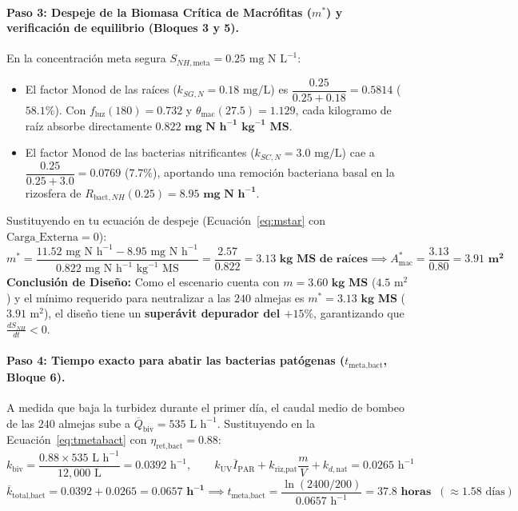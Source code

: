 \documentclass[11pt,letterpaper]{article}
\begin{document}
\paragraph{Paso 3: Despeje de la Biomasa Crítica de Macrófitas ($m^*$) y verificación de equilibrio (Bloques 3 y 5).}
En la concentración meta segura $S_{NH,\text{meta}} = 0.25\text{ mg N L}^{-1}$:
\begin{itemize}
    \item El factor Monod de las raíces ($k_{SG,N}=0.18\text{ mg/L}$) es $\dfrac{0.25}{0.25 + 0.18} = \mathbf{0.5814}$ ($58.1\%$). Con $f_{\text{luz}}(180) = 0.732$ y $\theta_{\text{mac}}(27.5) = 1.129$, cada kilogramo de raíz absorbe directamente $\mathbf{0.822\text{ mg N h}^{-1}\text{ kg}^{-1}\text{ MS}}$.
    \item El factor Monod de las bacterias nitrificantes ($k_{SC,N}=3.0\text{ mg/L}$) cae a $\dfrac{0.25}{0.25 + 3.0} = \mathbf{0.0769}$ ($7.7\%$), aportando una remoción bacteriana basal en la rizosfera de $R_{\text{bact},NH}(0.25) = \mathbf{8.95\text{ mg N h}^{-1}}$.
\end{itemize}
Sustituyendo en tu ecuación de despeje (Ecuación~\ref{eq:mstar} con $\text{Carga\_Externa} = 0$):
\[
    m^* = \frac{11.52\text{ mg N h}^{-1} - 8.95\text{ mg N h}^{-1}}{0.822\text{ mg N h}^{-1}\text{ kg}^{-1}\text{ MS}} = \frac{2.57}{0.822} = \mathbf{3.13\text{ kg MS de raíces}} \implies A_{\text{mac}}^* = \frac{3.13}{0.80} = \mathbf{3.91\text{ m}^2}
\]
\textbf{Conclusión de Diseño:} Como el escenario cuenta con $m = \mathbf{3.60\text{ kg MS}}$ ($4.5\text{ m}^2$) y el mínimo requerido para neutralizar a las $240$ almejas es $m^* = \mathbf{3.13\text{ kg MS}}$ ($3.91\text{ m}^2$), el diseño tiene un \textbf{superávit depurador del $+15\%$}, garantizando que $\frac{dS_{NH}}{dt} < 0$.

\paragraph{Paso 4: Tiempo exacto para abatir las bacterias patógenas ($t_{\text{meta,bact}}$, Bloque 6).}
A medida que baja la turbidez durante el primer día, el caudal medio de bombeo de las $240$ almejas sube a $\overline{Q}_{\text{biv}} = 535\text{ L h}^{-1}$. Sustituyendo en la Ecuación~\eqref{eq:tmetabact} con $\eta_{\text{ret,bact}} = 0.88$:
\[
    k_{\text{biv}} = \frac{0.88 \times 535\text{ L h}^{-1}}{12,000\text{ L}} = 0.0392\text{ h}^{-1}, \qquad k_{\text{UV}}\overline{I}_{\text{PAR}} + k_{\text{riz,pat}}\frac{m}{V} + k_{d,\text{nat}} = 0.0265\text{ h}^{-1}
\]
\[
    \overline{k}_{\text{total,bact}} = 0.0392 + 0.0265 = \mathbf{0.0657\text{ h}^{-1}} \implies t_{\text{meta,bact}} = \frac{\ln(2400 / 200)}{0.0657\text{ h}^{-1}} = \mathbf{37.8\text{ horas}} \;\; (\approx 1.58\text{ días})
\]
\end{document}
